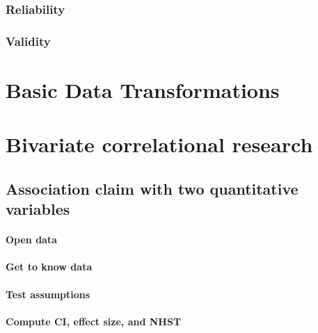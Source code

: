 \documentclass[
]{book}
\begin{document}
\hypertarget{reliability}{%
\subsection{Reliability}\label{reliability}}

\hypertarget{validity}{%
\subsection{Validity}\label{validity}}

\hypertarget{basic-data-transformations}{%
\chapter{Basic Data Transformations}\label{basic-data-transformations}}

\hypertarget{bivariate-correlational-research}{%
\chapter{Bivariate correlational research}\label{bivariate-correlational-research}}

\hypertarget{association-claim-with-two-quantitative-variables}{%
\section{Association claim with two quantitative variables}\label{association-claim-with-two-quantitative-variables}}

\hypertarget{open-data}{%
\subsubsection{Open data}\label{open-data}}

\hypertarget{get-to-know-data}{%
\subsubsection{Get to know data}\label{get-to-know-data}}

\hypertarget{test-assumptions}{%
\subsubsection{Test assumptions}\label{test-assumptions}}

\hypertarget{compute-ci-effect-size-and-nhst}{%
\subsubsection{Compute CI, effect size, and NHST}\label{compute-ci-effect-size-and-nhst}}
\end{document}
